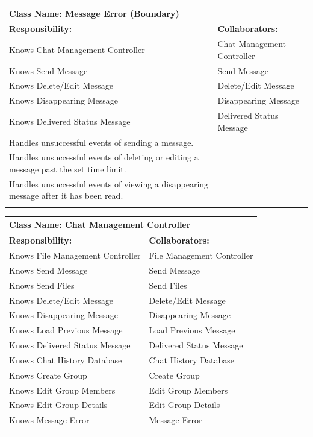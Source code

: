 \documentclass[]{article}
\begin{document}
\begin{itemize}
    	\begin{table}[ht]
		\centering
		\begin{tabular}{|p{7cm}|p{7cm}|}
		\hline 
		\multicolumn{2}{|l|}{\textbf{Class Name:} Message Error (Boundary)} \\
		\hline
		\textbf{Responsibility:} & \textbf{Collaborators:} \\
		\hline
  			Knows Chat Management Controller & Chat Management Controller \\
			Knows Send Message & Send Message \\
			Knows Delete/Edit Message & Delete/Edit Message \\
			Knows Disappearing Message & Disappearing Message \\
			Knows Delivered Status Message & Delivered Status Message \\
   			Handles unsuccessful events of sending a message. &\\
			Handles unsuccessful events of deleting or editing a message past the set time limit. &\\
			Handles unsuccessful events of viewing a disappearing message after it has been read. &\\
		\vspace{1in} & \\
		\hline
		\end{tabular}
	\end{table}

    	\begin{table}[ht]
		\centering
		\begin{tabular}{|p{7cm}|p{7cm}|}
		\hline 
		\multicolumn{2}{|l|}{\textbf{Class Name:} Chat Management Controller} \\
		\hline
		\textbf{Responsibility:} & \textbf{Collaborators:} \\
		\hline
  			Knows File Management Controller & File Management Controller \\
			Knows Send Message & Send Message \\
			Knows Send Files & Send Files \\
			Knows Delete/Edit Message & Delete/Edit Message \\
			Knows Disappearing Message & Disappearing Message \\
			Knows Load Previous Message & Load Previous Message \\
			Knows Delivered Status Message & Delivered Status Message \\
			Knows Chat History Database & Chat History Database \\
			Knows Create Group & Create Group \\
			Knows Edit Group Members & Edit Group Members \\
			Knows Edit Group Details & Edit Group Details \\
			Knows Message Error & Message Error \\
		\vspace{1in} & \\
		\hline
		\end{tabular}
	\end{table}


\end{itemize}
\end{document}
